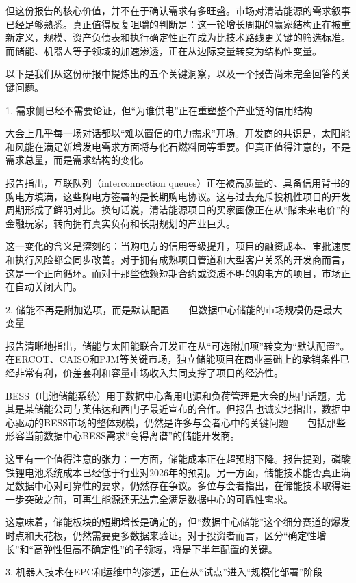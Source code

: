 \documentclass[11pt]{ctexart}
\begin{document}
但这份报告的核心价值，并不在于确认需求有多旺盛。市场对清洁能源的需求叙事已经足够熟悉。真正值得反复咀嚼的判断是：这一轮增长周期的赢家结构正在被重新定义，规模、资产负债表和执行确定性正在成为比技术路线更关键的筛选标准。而储能、机器人等子领域的加速渗透，正在从边际变量转变为结构性变量。

以下是我们从这份研报中提炼出的五个关键洞察，以及一个报告尚未完全回答的关键问题。

1. 需求侧已经不需要论证，但“为谁供电”正在重塑整个产业链的信用结构

大会上几乎每一场对话都以“难以置信的电力需求”开场。开发商的共识是，太阳能和风能在满足新增发电需求方面将与化石燃料同等重要。但真正值得注意的，不是需求总量，而是需求结构的变化。

报告指出，互联队列（interconnection queues）正在被高质量的、具备信用背书的购电方填满，这些购电方签署的是长期购电协议。这与过去充斥投机性项目的开发周期形成了鲜明对比。换句话说，清洁能源项目的买家画像正在从“赌未来电价”的金融玩家，转向拥有真实负荷和长期规划的产业巨头。

这一变化的含义是深刻的：当购电方的信用等级提升，项目的融资成本、审批速度和执行风险都会同步改善。对于拥有成熟项目管道和大型客户关系的开发商而言，这是一个正向循环。而对于那些依赖短期合约或资质不明的购电方的项目，市场正在自动关闭大门。

2. 储能不再是附加选项，而是默认配置——但数据中心储能的市场规模仍是最大变量

报告清晰地指出，储能与太阳能联合开发正在从“可选附加项”转变为“默认配置”。在ERCOT、CAISO和PJM等关键市场，独立储能项目在商业基础上的承销条件已经非常有利，价差套利和容量市场收入共同支撑了项目的经济性。

BESS（电池储能系统）用于数据中心备用电源和负荷管理是大会的热门话题，尤其是某储能公司与英伟达和西门子最近宣布的合作。但报告也诚实地指出，数据中心驱动的BESS市场的整体规模，仍然是许多与会者心中的关键问题——包括那些形容当前数据中心BESS需求“高得离谱”的储能开发商。

这里有一个值得注意的张力：一方面，储能成本正在超预期下降。报告提到，磷酸铁锂电池系统成本已经低于行业对2026年的预期。另一方面，储能技术能否真正满足数据中心对可靠性的要求，仍然存在争议。多位与会者指出，在储能技术取得进一步突破之前，可再生能源还无法完全满足数据中心的可靠性需求。

这意味着，储能板块的短期增长是确定的，但“数据中心储能”这个细分赛道的爆发时点和天花板，仍然需要更多数据来验证。对于投资者而言，区分“确定性增长”和“高弹性但高不确定性”的子领域，将是下半年配置的关键。

3. 机器人技术在EPC和运维中的渗透，正在从“试点”进入“规模化部署”阶段
\end{document}

